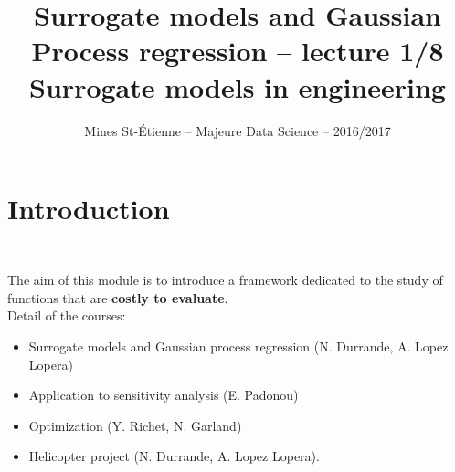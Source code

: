 \documentclass{beamer}
\title[Majeure Data Science -- Surrogate models and GPR]{\texorpdfstring{ \small Surrogate models and Gaussian Process regression -- lecture 1/8 \\ \vspace{3mm} \LARGE Surrogate models in engineering}{}}
\author[Mines St-\'Etienne ]{Mines St-\'Etienne -- Majeure Data Science -- 2016/2017}
\institute{\texorpdfstring{Nicolas Durrande (durrande@emse.fr)}{}}
\date{\null}
\begin{document}
\begin{frame}
  \titlepage
\end{frame}

\section[Intro.]{Introduction}
\subsection{}

\begin{frame}{}
\\
\vspace{0.5cm}
The aim of this module is to introduce a framework dedicated to the study of functions that are \textbf{costly to evaluate}.\\
\vspace{5mm}
Detail of the courses:
\begin{itemize}
	\item Surrogate models and Gaussian process regression (N. Durrande, A. Lopez Lopera)
	\item Application to sensitivity analysis (E. Padonou)
	\item Optimization (Y. Richet, N. Garland)
	\item Helicopter project (N. Durrande, A. Lopez Lopera).
\end{itemize}
\end{frame}
\end{document}

